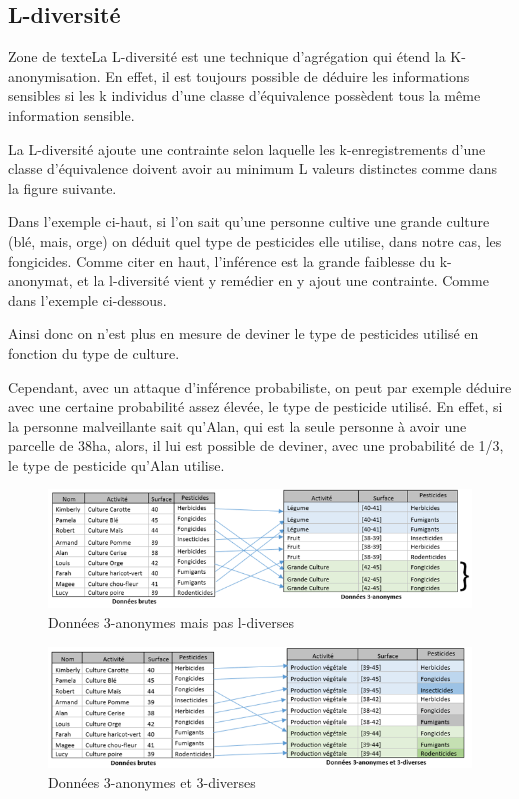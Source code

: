 \subsection{L-diversité}


Zone de texteLa L-diversité est une technique d’agrégation qui étend la K-anonymisation. En effet, il est toujours possible de déduire les informations sensibles si les k individus d’une classe d’équivalence possèdent tous la même information sensible.  

La L-diversité ajoute une contrainte selon laquelle les k-enregistrements d’une classe d’équivalence doivent avoir au minimum L valeurs distinctes comme dans la figure suivante.


Dans l’exemple ci-haut, si l’on sait qu’une personne cultive une grande culture (blé, mais, orge) on déduit quel type de pesticides elle utilise, dans notre cas, les fongicides.  Comme citer en haut, l’inférence est la grande faiblesse du k-anonymat, et la l-diversité vient y remédier en y ajout une contrainte. Comme dans l’exemple ci-dessous.  

Ainsi donc on n’est plus en mesure de deviner le type de pesticides utilisé en fonction du type de culture.  

Cependant, avec un attaque d’inférence probabiliste, on peut par exemple déduire avec une certaine probabilité assez élevée, le type de pesticide utilisé. En effet, si la personne malveillante sait qu’Alan, qui est la seule personne à avoir une parcelle de 38ha, alors, il lui est possible de deviner, avec une probabilité de 1/3, le type de pesticide qu’Alan utilise. 
\begin{figure}[!h]
    \centering
      \includegraphics[width=1\textwidth]{images/anonymisation/l_divers_image1.png}
    \caption{Données 3-anonymes mais pas l-diverses}
    \label{Données 3-anonymes mais pas l-diverses}
\end{figure}


\begin{figure}[!h]
    \centering
   \includegraphics[width=1\textwidth]{images/anonymisation/l_divers_image2.png}
    \caption{Données 3-anonymes et 3-diverses }
    \label{Données 3-anonymes et 3-diverses }
\end{figure}

